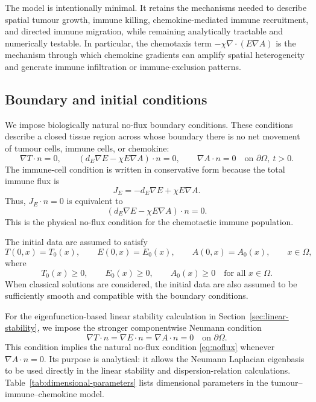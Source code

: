 \documentclass[a4paper,fleqn,longmktitle]{cas-sc}
\theoremstyle{plain}
\theoremstyle{definition}
\numberwithin{equation}{section}
\begin{document}
The model is intentionally minimal. It retains the mechanisms needed to describe
spatial tumour growth, immune killing, chemokine-mediated immune recruitment,
and directed immune migration, while remaining analytically tractable and
numerically testable. In particular, the chemotaxis term
$\displaystyle -\chi\nabla\cdot(E\nabla A)$
is the mechanism through which chemokine gradients can amplify spatial
heterogeneity and generate immune infiltration or immune-exclusion patterns.

\subsection{Boundary and initial conditions}
\label{subsec:boundary-initial-conditions}

We impose biologically natural no-flux boundary conditions. These conditions
describe a closed tissue region across whose boundary there is no net movement
of tumour cells, immune cells, or chemokine:
\begin{equation}\label{eq:noflux}
\nabla T\cdot n=0,\qquad
(d_E\nabla E-\chi E\nabla A)\cdot n=0,\qquad
\nabla A\cdot n=0
\quad\text{on }\partial\Omega,\ t>0 .
\end{equation}
The immune-cell condition is written in conservative form because the total
immune flux is
\[
J_E=-d_E\nabla E+\chi E\nabla A .
\]
Thus, $J_E\cdot n=0$ is equivalent to
\[
(d_E\nabla E-\chi E\nabla A)\cdot n=0.
\]
This is the physical no-flux condition for the chemotactic immune population.

The initial data are assumed to satisfy
\begin{equation}\label{eq:initial-data-dimensional}
T(0,x)=T_0(x),\qquad
E(0,x)=E_0(x),\qquad
A(0,x)=A_0(x),
\qquad x\in\Omega,
\end{equation}
where
\[
T_0(x)\ge0,\qquad E_0(x)\ge0,\qquad A_0(x)\ge0
\quad\text{for all }x\in\Omega .
\]
When classical solutions are considered, the initial data are also assumed to be
sufficiently smooth and compatible with the boundary conditions.

For the eigenfunction-based linear stability calculation in
Section~\ref{sec:linear-stability}, we impose the stronger componentwise
Neumann condition
\[
\nabla T\cdot n=\nabla E\cdot n=\nabla A\cdot n=0
\quad\text{on }\partial\Omega .
\]
This condition implies the natural no-flux condition \eqref{eq:noflux} whenever
$\nabla A\cdot n=0$. Its purpose is analytical: it allows the Neumann Laplacian
eigenbasis to be used directly in the linear stability and dispersion-relation
calculations. Table~\ref{tab:dimensional-parameters} lists dimensional parameters in the tumour--immune--chemokine model.
\end{document}
